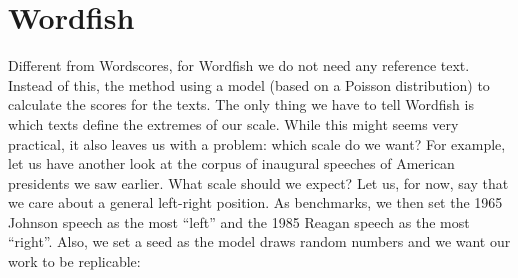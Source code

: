 \documentclass[
]{book}
\begin{document}
\section{Wordfish}\label{wordfish}

Different from Wordscores, for Wordfish we do not need any reference text. Instead of this, the method using a model (based on a Poisson distribution) to calculate the scores for the texts. The only thing we have to tell Wordfish is which texts define the extremes of our scale. While this might seems very practical, it also leaves us with a problem: which scale do we want? For example, let us have another look at the corpus of inaugural speeches of American presidents we saw earlier. What scale should we expect? Let us, for now, say that we care about a general left-right position. As benchmarks, we then set the 1965 Johnson speech as the most ``left'' and the 1985 Reagan speech as the most ``right''. Also, we set a seed as the model draws random numbers and we want our work to be replicable:
\end{document}

